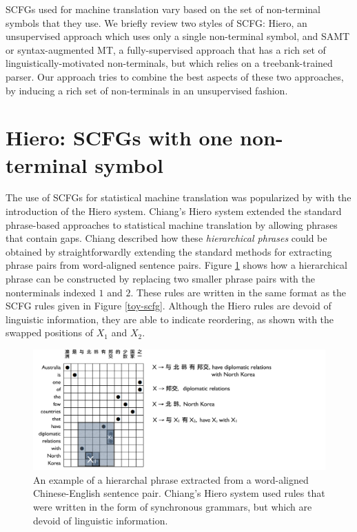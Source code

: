 SCFGs used for machine translation vary based on the set of non-terminal symbols that they use.  
We briefly review two styles of SCFG: Hiero, an unsupervised approach  which uses only a single non-terminal symbol, and SAMT or syntax-augmented MT, a fully-supervised approach that has a rich set of linguistically-motivated non-terminals, but which relies on a treebank-trained parser.   
Our approach tries to combine the best aspects of these two approaches, by inducing a rich set of non-terminals in an unsupervised fashion.

\section{Hiero: SCFGs with one non-terminal symbol}\label{sec:hiero}

The use of SCFGs for statistical machine translation was popularized by \citet{Chiang2005} with the introduction of the Hiero system.  Chiang's Hiero system extended the standard phrase-based approaches to statistical machine translation by allowing phrases that contain gaps.  Chiang described how these {\it hierarchical phrases} could be obtained by straightforwardly extending the standard methods \cite{Koehn2004,Koehn2003,Tillmann2003,Venugopal2003} for extracting phrase pairs from word-aligned sentence pairs.  Figure \ref{hiero-phrase-extraction} shows how a hierarchical phrase can be constructed by replacing two smaller phrase pairs with the nonterminals indexed $1$ and $2$.   These rules are written in the same format as the SCFG rules given in Figure \ref{toy-scfg}.  Although the Hiero rules are devoid of linguistic information, they are able to indicate reordering, as shown with the swapped positions of $X_1$ and $X_2$. 

\begin{figure}
\begin{center}
\includegraphics[width=.9\linewidth]{SCFGs/hiero-phrase-extraction.pdf}
\end{center}
\caption{An example of a hierarchal phrase extracted from a word-aligned Chinese-English sentence pair.  Chiang's Hiero system used rules that were written in the form of synchronous grammars, but which are devoid of linguistic information.}\label{hiero-phrase-extraction}
\end{figure}


